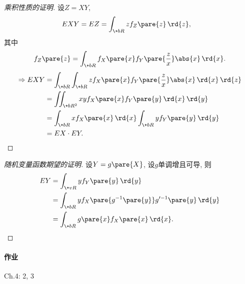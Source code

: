 \documentclass{ctexart}
\begin{document}
\begin{proof}[乘积性质的证明]
    设$Z = XY$,
    \begin{align*}
        EXY &= EZ = \int_{\+bR} zf_Z\pare{z}\,\rd{z},
    \end{align*}
    其中
    \[ f_Z\pare{z} = \int_{\+bR} f_X\pare{x} f_Y\pare{\frac{z}{x}}\abs{x}\,\rd{x}. \]
    \begin{align*}
        \Rightarrow EXY &= \int_{\+bR} \int_{\+bR} zf_X\pare{x} f_Y\pare{\frac{z}{x}}\abs{x}\,\rd{x}\,\rd{z} \\
        &= \iint_{\+bR^2} xyf_X\pare{x}f_Y\pare{y} \,\rd{x}\,\rd{y} \\
        &= \int_{\+bR} xf_X\pare{x}\,\rd{x} \int_{\+bR} yf_Y\pare{y}\,\rd{y} \\
        &= EX\cdot EY. \qedhere
    \end{align*}
\end{proof}
\begin{proof}[随机变量函数期望的证明]
    设$Y = g\pare{X}$, 设$g$单调增且可导, 则
    \begin{align*}
        EY &= \int_{\+vR} yf_Y\pare{y}\,\rd{y} \\
        &= \int_{\+bR} yf_X\pare{g^{-1}\pare{y}}g'^{-1}\pare{y}\,\rd{y} \\
        &= \int_{\+bR} g\pare{x} f_X\pare{x} \,\rd{x}. \qedhere
    \end{align*}
\end{proof}

\paragraph{作业} %
\label{par:作业}

Ch.4: 2, 3

\end{document}
